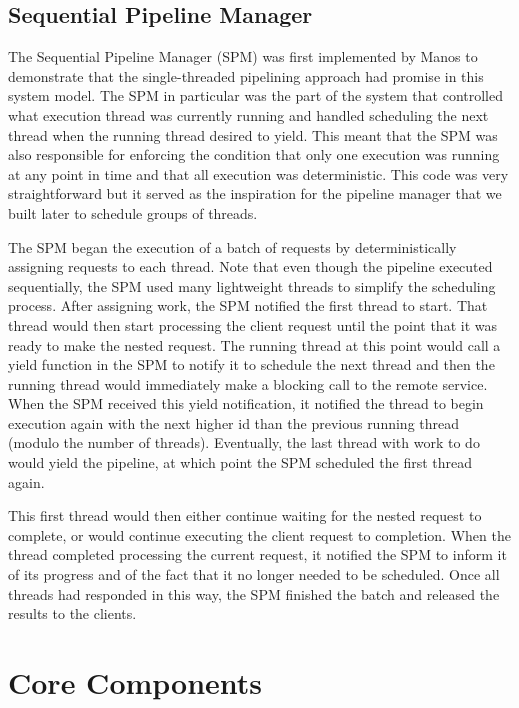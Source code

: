 \documentclass[11pt, oneside]{report}
\begin{document}
\subsection{Sequential Pipeline Manager}\label{SPM}

The Sequential Pipeline Manager (SPM) was first implemented by Manos to demonstrate that the single-threaded pipelining approach had promise in this system model. 
The SPM in particular was the part of the system that controlled what execution thread was currently running and handled scheduling the next thread when the running thread desired to yield.
This meant that the SPM was also responsible for enforcing the condition that only one execution was running at any point in time and that all execution was deterministic.
This code was very straightforward but it served as the inspiration for the pipeline manager that we built later to schedule groups of threads.

The SPM began the execution of a batch of requests by deterministically assigning requests to each thread.
Note that even though the pipeline executed sequentially, the SPM used many lightweight threads to simplify the scheduling process. 
After assigning work, the SPM notified the first thread to start. 
That thread would then start processing the client request until the point that it was ready to make the nested request. 
The running thread at this point would call a yield function in the SPM to notify it to schedule the next thread and then the running thread would immediately make a blocking call to the remote service. 
When the SPM received this yield notification, it notified the thread to begin execution again with the next higher id than the previous running thread (modulo the number of threads). 
Eventually, the last thread with work to do would yield the pipeline, at which point the SPM scheduled the first thread again. 

This first thread would then either continue waiting for the nested request to complete, or would continue executing the client request to completion. 
When the thread completed processing the current request, it notified the SPM to inform it of its progress and of the fact that it no longer needed to be scheduled. 
Once all threads had responded in this way, the SPM finished the batch and released the results to the clients.

\section{Core Components}
\end{document}
